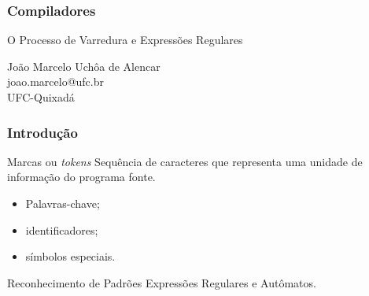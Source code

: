\documentclass[table]{beamer}
\begin{document}
\begin{frame}
   \frametitle{Compiladores}
   \large
   \begin{center}
      O Processo de Varredura e Expressões Regulares 
   \end{center}
   \scriptsize
   \begin{center}
      João Marcelo Uchôa de Alencar \\
      joao.marcelo@ufc.br \\
      UFC-Quixadá
   \end{center}
\end{frame}

\begin{frame}
   \tableofcontents
\end{frame}

\begin{frame}
   \frametitle{Introdução}
   \begin{block}{Marcas ou \textit{tokens}}
   Sequência de caracteres que representa uma unidade de informação do programa fonte.
   \end{block}
   \begin{itemize}
      \item Palavras-chave;
      \item identificadores;
      \item símbolos especiais.
   \end{itemize}
   \begin{block}{Reconhecimento de Padrões}
   Expressões Regulares e Autômatos.
   \end{block}
\end{frame}
\end{document}
